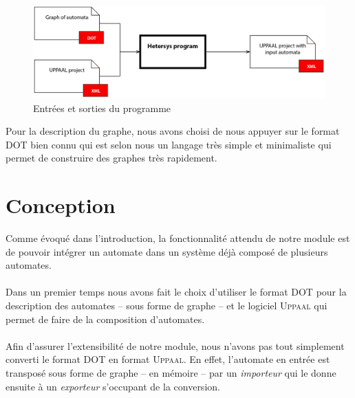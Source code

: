 \documentclass[12pt,a4paper]{report}
\begin{document}
\begin{figure}[h]
  \centering
  \includegraphics[scale=0.3]{ressources/ProgramScheme.png}
  \caption{Entrées et sorties du programme}
\end{figure}

Pour la description du graphe, nous avons choisi de nous appuyer
sur le format DOT bien connu qui est selon nous un langage très simple et minimaliste 
qui permet de construire des graphes très rapidement.

\section{Conception}

Comme évoqué dans l'introduction, la fonctionnalité attendu de notre module 
est de pouvoir intégrer un automate dans un système déjà composé de plusieurs
automates. 
\\\\
Dans un premier temps nous avons fait le choix d'utiliser le format DOT pour 
la description des automates -- sous forme de graphe -- et le logiciel \textsc{Uppaal}
qui permet de faire de la composition d'automates.
\\\\
Afin d'assurer l'extensibilité de notre module, nous n'avons pas tout simplement
converti le format DOT en format \textsc{Uppaal}. En effet, l'automate en entrée
est transposé sous forme de graphe -- en mémoire -- par un \emph{importeur} qui 
le donne ensuite à un \emph{exporteur} s'occupant de la conversion.
\end{document}

